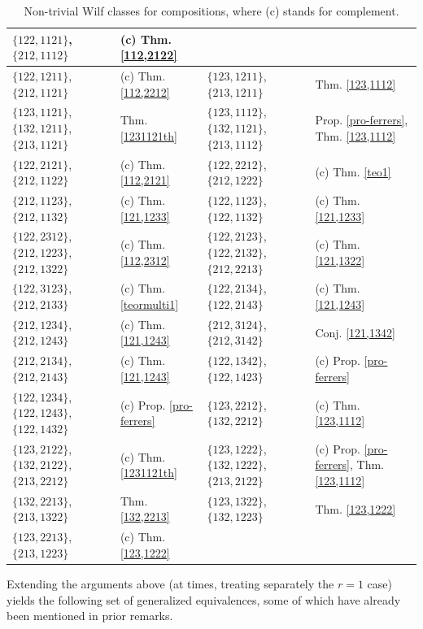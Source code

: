\documentclass[11pt]{amsart}
\theoremstyle{plain}
\theoremstyle{definition}
\begin{document}
\begin{table}[htp]
\begin{tabular}{|p{4.15cm}|p{2.6cm}||p{4.15cm}|p{3.6cm}|}
$\{122,1121\}$, $\{212,1112\}$&(c) Thm. \ref{112,2122}\\\hline
$\{122,1211\}$, $\{212,1121\}$&(c) Thm. \ref{112,2212}&
$\{123,1211\}$, $\{213,1211\}$&Thm. \ref{123,1112}\\\hline
$\{123,1121\}$, $\{132,1211\}$, $\{213,1121\}$&Thm. \ref{1231121th}&
$\{123,1112\}$, $\{132,1121\}$, $\{213,1112\}$&Prop. \ref{pro-ferrers}, Thm. \ref{123,1112}\\\hline
$\{122,2121\}$, $\{212,1122\}$&(c) Thm. \ref{112,2121}&
$\{122,2212\}$, $\{212,1222\}$&(c) Thm. \ref{teo1}\\\hline
$\{212,1123\}$, $\{212,1132\}$&(c) Thm. \ref{121,1233}&
$\{122,1123\}$, $\{122,1132\}$&(c) Thm. \ref{121,1233}\\\hline
$\{122,2312\}$, $\{212,1223\}$, $\{212,1322\}$&(c) Thm. \ref{112,2312}&
$\{122,2123\}$, $\{122,2132\}$, $\{212,2213\}$&(c) Thm. \ref{121,1322}\\\hline
$\{122,3123\}$, $\{212,2133\}$&(c) Thm. \ref{teormulti1}&
$\{122,2134\}$, $\{122,2143\}$&(c) Thm. \ref{121,1243}\\\hline
$\{212,1234\}$, $\{212,1243\}$&(c) Thm. \ref{121,1243}&
$\{212,3124\}$, $\{212,3142\}$&Conj. \ref{121,1342}\\\hline
$\{212,2134\}$, $\{212,2143\}$&(c) Thm. \ref{121,1243}&
$\{122,1342\}$, $\{122,1423\}$&(c) Prop. \ref{pro-ferrers}\\\hline
$\{122,1234\}$, $\{122,1243\}$, $\{122,1432\}$&(c) Prop. \ref{pro-ferrers}&
$\{123,2212\}$, $\{132,2212\}$&(c) Thm. \ref{123,1112}\\\hline
$\{123,2122\}$, $\{132,2122\}$, $\{213,2212\}$&(c) Thm. \ref{1231121th}&
$\{123,1222\}$, $\{132,1222\}$, $\{213,2122\}$&(c) Prop. \ref{pro-ferrers}, Thm. \ref{123,1112}\\\hline
$\{132,2213\}$, $\{213,1322\}$&Thm. \ref{132,2213}&
$\{123,1322\}$, $\{132,1223\}$&Thm. \ref{123,1222}\\\hline
$\{123,2213\}$, $\{213,1223\}$&(c) Thm. \ref{123,1222}&&\\\hline
\end{tabular}
\caption{Non-trivial Wilf classes for compositions, where (c) stands for complement.}\label{tabnontrivialw}
\end{table}

Extending the arguments above (at times, treating separately the $r=1$ case) yields the following
set of generalized equivalences, some of which have already been mentioned in prior remarks.
\end{document}
